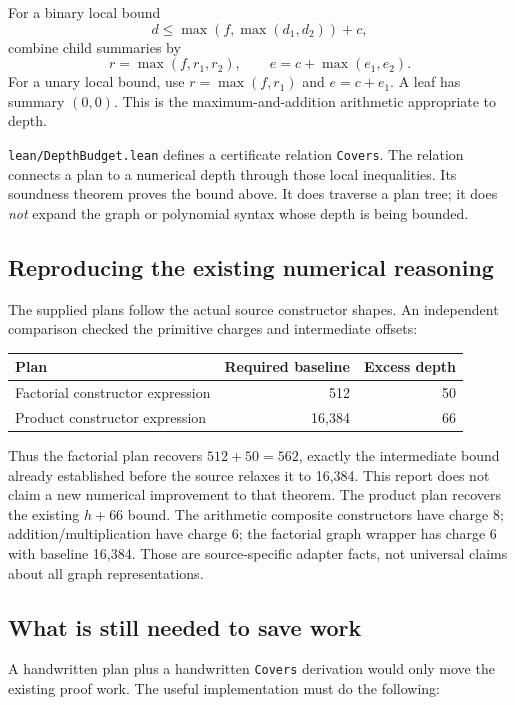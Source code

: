 \documentclass[11pt]{article}
\theoremstyle{remark}\newtheorem{remark}[theorem]{Remark}
\newcommand{\code}[1]{\nolinkurl{#1}}
\begin{document}
For a binary local bound
\[
 d\le\max(f,\max(d_1,d_2))+c,
\]
combine child summaries by
\[
 r=\max(f,r_1,r_2),\qquad e=c+\max(e_1,e_2).
\]
For a unary local bound, use \(r=\max(f,r_1)\) and \(e=c+e_1\). A leaf has summary \((0,0)\). This is the maximum-and-addition arithmetic appropriate to depth.

\code{lean/DepthBudget.lean} defines a certificate relation \code{Covers}. The relation connects a plan to a numerical depth through those local inequalities. Its soundness theorem proves the bound above. It does traverse a plan tree; it does \emph{not} expand the graph or polynomial syntax whose depth is being bounded.

\subsection{Reproducing the existing numerical reasoning}

The supplied plans follow the actual source constructor shapes. An independent comparison checked the primitive charges and intermediate offsets:

\begin{center}\small
\begin{tabular}{@{}P{67mm}r r@{}}
\toprule
Plan & Required baseline & Excess depth\\
\midrule
Factorial constructor expression & 512 & 50\\
Product constructor expression & 16,384 & 66\\
\bottomrule
\end{tabular}
\end{center}

Thus the factorial plan recovers \(512+50=562\), exactly the intermediate bound already established before the source relaxes it to 16,384. This report does not claim a new numerical improvement to that theorem. The product plan recovers the existing \(h+66\) bound. The arithmetic composite constructors have charge 8; addition/multiplication have charge 6; the factorial graph wrapper has charge 6 with baseline 16,384. Those are source-specific adapter facts, not universal claims about all graph representations.

\subsection{What is still needed to save work}

A handwritten plan plus a handwritten \code{Covers} derivation would only move the existing proof work. The useful implementation must do the following:
\end{document}

